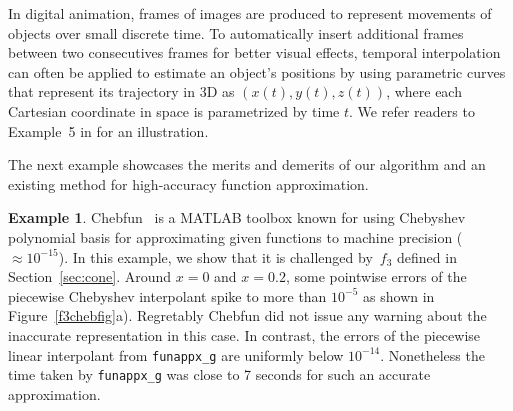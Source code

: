 \documentclass[review]{elsarticle}
\theoremstyle{definition}
\newtheorem{exmp}{Example}
\newcommand{\funappxg}{\texttt{funappx\_g\xspace}}
\begin{document}
In digital animation, frames of images are produced to represent movements of
objects over small discrete time. To automatically insert additional frames between 
two consecutives frames for better visual effects, temporal
interpolation can often be applied to estimate an object's positions by using
parametric curves that represent its trajectory in 3D as $(x(t), y(t), z(t))$,
where each Cartesian coordinate in space is parametrized by time $t$. We refer
readers to Example~5 in \cite[Chapter~3, Section~6]{Din15a} for an illustration.


The next example showcases the merits and demerits of our algorithm and an
existing method for high-accuracy function approximation.

\begin{exmp}
Chebfun~\cite{TrefEtal15a} is a MATLAB toolbox known for using Chebyshev
polynomial basis for approximating given functions to machine precision
($\approx 10^{-15}$). In this example, we show that it is challenged by~$f_3$
defined in Section~\ref{sec:cone}. Around $x=0$ and $x=0.2$, some pointwise
errors of the piecewise Chebyshev interpolant spike to more than $10^{-5}$ as
shown in Figure~\ref{f3chebfig}a). Regretably Chebfun did not issue any warning
about the inaccurate representation in this case. In contrast, the errors of the
piecewise linear interpolant from \funappxg{} are uniformly below $10^{-14}$.
Nonetheless the time taken by \funappxg{} was close to 7 seconds for such an 
accurate approximation.


\end{exmp}
\end{document}

